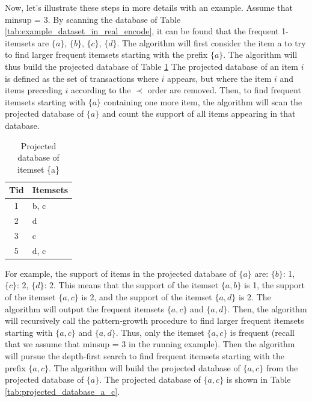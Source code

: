 Now, let's illustrate these steps in more details with an example. Assume that minsup =
3. By scanning the database of Table \ref{tab:example_dataset_in_real_encode}, it can be found that the frequent 1-itemsets are
$\{a\}$, $\{b\}$, $\{c\}$, $\{d\}$. The algorithm will first consider the item a to try to find larger frequent itemsets
starting with the prefix $\{a\}$. The algorithm will thus build the projected database of Table \ref{tab:projected_database}
The projected database of an item $i$ is defined as the set of transactions
where $i$ appears, but where the item $i$ and items preceding $i$ according to the $\prec$ order are removed.
Then, to find frequent itemsets starting with $\{a\}$ containing one more item,
the algorithm will scan the projected database of $\{a\}$ and count the support of all items
appearing in that database.
\begin{table}
    \centering
    \caption{Projected database of itemset \{a\}}
    \label{tab:projected_database}
    \begin{tabular}{|c|l|}
        \hline
        \textbf{Tid} & \textbf{Itemsets} \\
        \hline
        1            & b, c              \\
        2            & d                 \\
        3            & c                 \\
        5            & d, c              \\
        \hline
    \end{tabular}
\end{table}

For example, the support of items in the projected database
of $\{a\}$ are: $\{b\}$: 1, $\{c\}$: 2, $\{d\}$: 2. This means that the support of the itemset $\{a, b\}$ is 1, the support of the itemset $\{a, c\}$ is 2, and the support of the itemset $\{a, d\}$ is 2. The algorithm will output the frequent itemsets $\{a, c\}$ and $\{a, d\}$.
Then, the algorithm will recursively call the pattern-growth procedure to find larger frequent itemsets starting with $\{a, c\}$ and $\{a, d\}$.
Thus, only the itemset $\{a, c\}$ is frequent (recall that we assume that minsup = 3 in the running example).
Then the
algorithm will pursue the depth-first search to find frequent itemsets starting with the prefix $\{a, c\}$.
The algorithm will build the projected database of $\{a, c\}$ from the projected database
of $\{a\}$. The projected database of $\{a, c\}$ is shown in Table \ref{tab:projected_database_a_c}.

